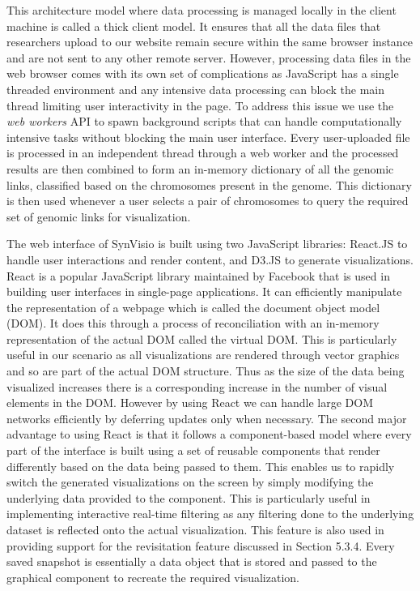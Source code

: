This architecture model where data processing is managed locally in the client machine is called a thick client model. It ensures that all the data files that researchers upload to our website remain secure within the same browser instance and are not sent to any other remote server. However, processing data files in the web browser comes with its own set of complications as JavaScript has a single threaded environment and any intensive data processing can block the main thread limiting user interactivity in the page. To address this issue we use the \textit{web workers} API to spawn background scripts that can handle computationally intensive tasks without blocking the main user interface\cite{webworkers}. Every user-uploaded file is processed in an independent thread through a web worker and the processed results are then combined to form an in-memory dictionary of all the genomic links, classified based on the chromosomes present in the genome. This dictionary is then used whenever a user selects a pair of chromosomes to query the required set of genomic links for visualization.

The web interface of SynVisio is built using two JavaScript libraries: React.JS\cite{react} to handle user interactions and render content, and D3.JS\cite{d3js} to generate visualizations.
React is a popular JavaScript library maintained by Facebook\cite{facebook} that is used in building user interfaces in single-page applications. It can efficiently manipulate the representation of a webpage which is called the document object model (DOM). It does this through a process of reconciliation with an in-memory representation of the actual DOM called the virtual DOM. This is particularly useful in our scenario as all visualizations are rendered through vector graphics and so are part of the actual DOM structure. Thus as the size of the data being visualized increases there is a corresponding increase in the number of visual elements in the DOM. However by using React we can handle large DOM networks efficiently by deferring updates only when necessary. The second major advantage to using React is that it follows a component-based model where every part of the interface is built using a set of reusable components that render differently based on the data being passed to them. This enables us to rapidly switch the generated visualizations on the screen by simply modifying the underlying data provided to the component. This is particularly useful in implementing interactive real-time filtering as any filtering done to the underlying dataset is reflected onto the actual visualization. This feature is also used in providing support for the revisitation feature discussed in Section 5.3.4. Every saved snapshot is essentially a data object that is stored and passed to the graphical component to recreate the required visualization.

